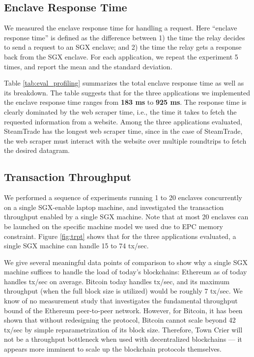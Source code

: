 \subsection{Enclave Response Time}
We measured the enclave response time for handling a request. Here ``enclave response time''
is defined as the difference between 1) the time 
the relay decides to send a request to an SGX enclave;
and 2) the time the relay gets a response back from the SGX enclave. 
For each application, we repeat the  
experiment 5 times, and report the mean and the standard deviation.  

Table \ref{tab:eval_profiling} summarizes the total enclave response time as
well as its breakdown.  The table suggests that for the three applications we
implemented the enclave response time ranges from {\bf 183 ms} to {\bf 925 ms}.
The response time is clearly dominated by the web scraper time, i.e., the time
it takes to fetch the requested information from a website.  Among the three
applications evaluated, {\sf SteamTrade} has the longest web scraper time, since
in the case of {\sf SteamTrade}, the web scraper must interact with the website
over multiple roundtrips to fetch the desired datagram.

\subsection{Transaction Throughput}
We performed a sequence of experiments running 1 to 20 enclaves 
concurrently
on a single SGX-enable laptop
machine, and investigated the transaction throughput 
enabled by a single SGX machine. 
Note that at most 20 \tc enclaves can be launched
on the specific machine model we used due to EPC memory
constraint.
Figure \ref{fig:trpt}
shows that for the three applications evaluated,
a single SGX machine can handle
15 to 74
tx/sec.

We give several meaningful data points of comparison to show
why a single SGX machine suffices to handle the load of
today's blockchains: 
Ethereum as of today handles 
 tx/sec on average. 
Bitcoin today handles
 tx/sec, and 
its maximum throughput (when the full block size is utilized)
would be roughly 7 tx/sec.
We know of no measurement study that 
investigates the fundamental 
throughput bound of the Ethereum  peer-to-peer network.
However, for Bitcoin, it has been shown that without
redesigning the protocol, 
Bitcoin cannot scale beyond  
42 tx/sec  by simple reparametrization of its block size.
Therefore, Town Crier will not be a throughput 
bottleneck when used 
with decentralized blockchains --- it appears 
more imminent to scale up 
the blockchain protocols themselves.

